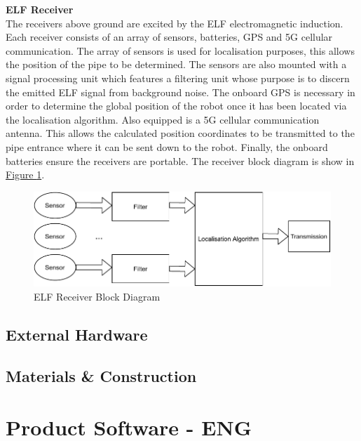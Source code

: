 \documentclass[11pt]{article}		%
\newcommand{\figref}[1]{\hyperref[#1]{Figure \ref*{#1}}}    %
\begin{document}
		
		
		\textbf{ELF Receiver}\\
		The receivers above ground are excited by the ELF electromagnetic induction. Each receiver consists of an array of sensors, batteries, GPS and 5G cellular communication. The array of sensors is used for localisation purposes, this allows the position of the pipe to be determined. The sensors are also mounted with a signal processing unit which features a filtering unit whose purpose is to discern the emitted ELF signal from background noise. The onboard GPS is necessary in order to determine the global position of the robot once it has been located via the localisation algorithm. Also equipped is a 5G cellular communication antenna. This allows the calculated position coordinates to be transmitted to the pipe entrance where it can be sent down to the robot.  Finally, the onboard batteries ensure the receivers are portable. The receiver block diagram is show in \figref{ELFrec}.
	    
	    \begin{figure}[h]
			\centering
			\includegraphics[scale=0.7]{blockreceiever.pdf}
			\caption{ELF Receiver Block Diagram}
			\label{ELFrec}
		\end{figure}
		

		
		
		

		\subsection{External Hardware}
		
		
	
		\subsection{Materials \& Construction}
		
	
	\section{Product Software - ENG}
		
\end{document}
